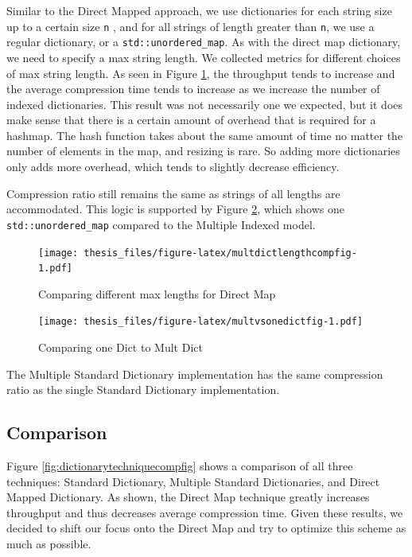 \documentclass[12pt,twoside]{reedthesis}
\begin{document}
Similar to the Direct Mapped approach, we use dictionaries for each string size up to a certain size \texttt{n} , and for all strings of length greater than \texttt{n}, we use a regular dictionary, or a \texttt{std::unordered\_map}. As with the direct map dictionary, we need to specify a max string length. We collected metrics for different choices of max string length. As seen in Figure \ref{fig:multdictlengthcompfig}, the throughput tends to increase and the average compression time tends to increase as we increase the number of indexed dictionaries. This result was not necessarily one we expected, but it does make sense that there is a certain amount of overhead that is required for a hashmap. The hash function takes about the same amount of time no matter the number of elements in the map, and resizing is rare. So adding more dictionaries only adds more overhead, which tends to slightly decrease efficiency.

Compression ratio still remains the same as strings of all lengths are accommodated.
This logic is supported by Figure \ref{fig:multvsonedictfig}, which shows one \texttt{std::unordered\_map} compared to the Multiple Indexed model.
\begin{figure}
\centering
\texttt{[image: thesis\_files/figure-latex/multdictlengthcompfig-1.pdf]}
\caption{\label{fig:multdictlengthcompfig}Comparing different max lengths for Direct Map}
\end{figure}
\begin{figure}
\centering
\texttt{[image: thesis\_files/figure-latex/multvsonedictfig-1.pdf]}
\caption{\label{fig:multvsonedictfig}Comparing one Dict to Mult Dict}
\end{figure}
The Multiple Standard Dictionary implementation has the same compression ratio as the single Standard Dictionary implementation.

\hypertarget{comparison-1}{%
\subsection{Comparison}\label{comparison-1}}

Figure \ref{fig:dictionarytechniquecompfig} shows a comparison of all three techniques: Standard Dictionary, Multiple Standard Dictionaries, and Direct Mapped Dictionary. As shown, the Direct Map technique greatly increases throughput and thus decreases average compression time. Given these results, we decided to shift our focus onto the Direct Map and try to optimize this scheme as much as possible.
\end{document}
